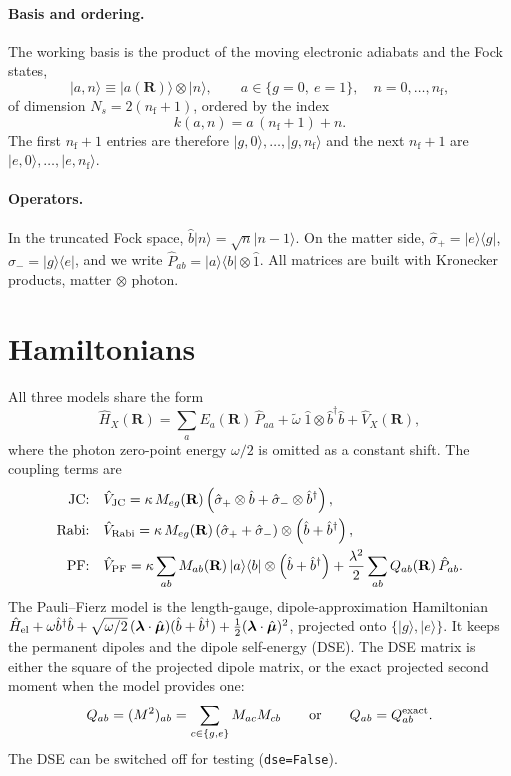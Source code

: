 \documentclass[11pt]{article}
\newcommand{\ket}[1]{\lvert #1 \rangle}
\newcommand{\bra}[1]{\langle #1 \rvert}
\newcommand{\R}{\mathbf{R}}
\newcommand{\bdag}{\hat b^{\dagger}}
\newcommand{\bop}{\hat b}
\newcommand{\mub}{\bm{\mu}}
\newcommand{\wt}{\tilde\omega}
\newcommand{\code}[1]{\texttt{#1}}
\newcommand{\nf}{n_{\mathrm f}}
\begin{document}
\paragraph{Basis and ordering.}
The working basis is the product of the moving electronic adiabats and the Fock states,
\begin{equation}
\ket{a,n}\equiv\ket{a(\R)}\otimes\ket{n},\qquad a\in\{g\!=\!0,\ e\!=\!1\},\quad n=0,\dots,\nf,
\end{equation}
of dimension $N_s=2(\nf+1)$, ordered by the index
\begin{equation}
k(a,n)=a\,(\nf+1)+n .
\end{equation}
The first $\nf+1$ entries are therefore $\ket{g,0},\dots,\ket{g,\nf}$ and the next $\nf+1$ are $\ket{e,0},\dots,\ket{e,\nf}$.

\paragraph{Operators.} In the truncated Fock space, $\bop\ket{n}=\sqrt n\ket{n-1}$. On the matter side, $\hat\sigma_+=\ket e\bra g$, $\hat\sigma_-=\ket g\bra e$, and we write $\hat P_{ab}=\ket a\bra b\otimes\hat 1$. All matrices are built with Kronecker products, matter $\otimes$ photon.

\section{Hamiltonians}
\label{sec:H}
All three models share the form
\begin{equation}
\hat H_X(\R)=\sum_{a}E_a(\R)\,\hat P_{aa}+\wt\;\hat 1\otimes\bdag\bop+\hat V_X(\R),
\end{equation}
where the photon zero-point energy $\omega/2$ is omitted as a constant shift. The coupling terms are
\begin{align}
\text{JC:}\quad & \hat V_{\rm JC}=\kappa\,M_{eg}(\R)\left(\hat\sigma_+\otimes\bop+\hat\sigma_-\otimes\bdag\right),\\
\text{Rabi:}\quad & \hat V_{\rm Rabi}=\kappa\,M_{eg}(\R)\left(\hat\sigma_++\hat\sigma_-\right)\otimes\left(\bop+\bdag\right),\\
\text{PF:}\quad & \hat V_{\rm PF}=\kappa\sum_{ab}M_{ab}(\R)\,\ket a\bra b\otimes\left(\bop+\bdag\right)
+\frac{\lambda^2}{2}\sum_{ab}Q_{ab}(\R)\,\hat P_{ab}.
\label{eq:HPF}
\end{align}
The Pauli--Fierz model is the length-gauge, dipole-approximation Hamiltonian
$\hat H_{\rm el}+\omega\bdag\bop+\sqrt{\omega/2}\,(\bm\lambda\cdot\hat{\mub})(\bop+\bdag)+\tfrac12(\bm\lambda\cdot\hat{\mub})^2$,
projected onto $\{\ket g,\ket e\}$. It keeps the permanent dipoles and the dipole self-energy (DSE). The DSE matrix is either the square of the projected dipole matrix, or the exact projected second moment when the model provides one:
\begin{equation}
Q_{ab}=(M^2)_{ab}=\sum_{c\in\{g,e\}}M_{ac}M_{cb}\qquad\text{or}\qquad Q_{ab}=Q^{\rm exact}_{ab}.
\end{equation}
The DSE can be switched off for testing (\code{dse=False}).
\end{document}
